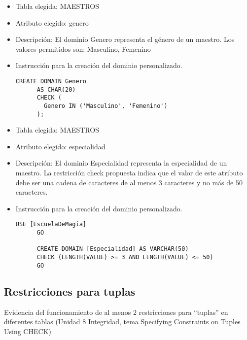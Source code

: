 \begin{itemize}
    \item Tabla elegida: MAESTROS
    \item Atributo elegido: genero
    \item Descripción: El dominio Genero representa el género de un maestro. Los valores permitidos son: Masculino, Femenino
    \item Instrucción para la creación del dominio personalizado.
    
    \begin{lstlisting}[caption={Tablas para la BdDatos}, label={lst:sql_estadios}]
      CREATE DOMAIN Genero
      AS CHAR(20)
      CHECK (
        Genero IN ('Masculino', 'Femenino')
      );      
    \end{lstlisting}    
\end{itemize}


\begin{itemize}
    \item Tabla elegida: MAESTROS
    \item Atributo elegido: especialidad
    \item Descripción: El dominio Especialidad representa la especialidad de un maestro. La restricción check propuesta indica que el valor de este atributo debe ser una cadena de caracteres de al menos 3 caracteres y no más de 50 caracteres.
    \item Instrucción para la creación del dominio personalizado.
    
    \begin{lstlisting}[caption={Tablas para la BdDatos}, label={lst:sql_estadios}]
      USE [EscuelaDeMagia]
      GO

      CREATE DOMAIN [Especialidad] AS VARCHAR(50)
      CHECK (LENGTH(VALUE) >= 3 AND LENGTH(VALUE) <= 50)
      GO
    \end{lstlisting}    
\end{itemize}



\subsection{Restricciones para tuplas}

Evidencia del funcionamiento de al menos 2 restricciones para “tuplas” en diferentes tablas (Unidad 8 Integridad, tema Specifying Constraints on Tuples Using CHECK)

